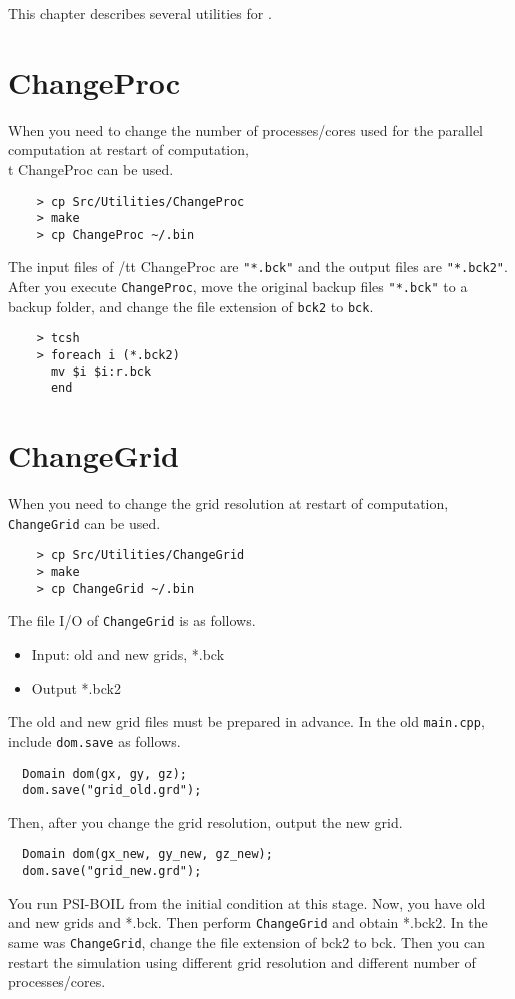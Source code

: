 \label{chap_post_process}

This chapter describes several utilities for {\psiboil}.

\section{ChangeProc}
\label{sec_changeproc}
When you need to change the number of processes/cores used for the parallel computation at restart of computation, {\\t ChangeProc} can be used. 
\begin{verbatim}
	> cp Src/Utilities/ChangeProc
	> make
	> cp ChangeProc ~/.bin
\end{verbatim} 
The input files of {/tt ChangeProc} are {\tt "*.bck"} and the output files are {\tt "*.bck2"}. After you execute {\tt ChangeProc}, move the original backup files {\tt "*.bck"} to a backup folder, and change the file extension of {\tt bck2} to {\tt bck}.
\begin{verbatim}
	> tcsh
	> foreach i (*.bck2)
	  mv $i $i:r.bck
	  end
\end{verbatim} 

\section{ChangeGrid}
\label{sec_changeproc}
When you need to change the grid resolution at restart of computation, {\tt ChangeGrid} can be used. 
\begin{verbatim}
	> cp Src/Utilities/ChangeGrid
	> make
	> cp ChangeGrid ~/.bin
\end{verbatim} 
The file I/O of {\tt ChangeGrid} is as follows.
    \begin{itemize}
	\item Input: old and new grids, *.bck
	\item Output *.bck2
\end{itemize}
The old and new grid files must be prepared in advance.  In the old {\tt main.cpp}, include {\tt dom.save} as follows.
{\small \begin{verbatim}
  Domain dom(gx, gy, gz);
  dom.save("grid_old.grd");
\end{verbatim}}

Then, after you change the grid resolution, output the new grid.
{\small \begin{verbatim}
  Domain dom(gx_new, gy_new, gz_new);
  dom.save("grid_new.grd");
\end{verbatim}}
You run PSI-BOIL from the initial condition at this stage. Now, you have old and new grids and *.bck.  Then perform {\tt ChangeGrid} and obtain *.bck2. In the same was {\tt ChangeGrid}, change the file extension of bck2 to bck. Then you can restart the simulation using different grid resolution and different number of processes/cores.